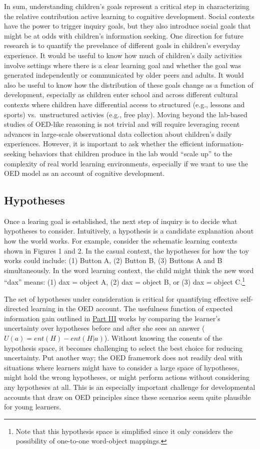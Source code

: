 \documentclass[oneside]{report}
\begin{document}
In sum, understanding children's goals represent a critical step in
characterizing the relative contribution active learning to cognitive
development. Social contexts have the power to trigger inquiry goals,
but they also introduce social goals that might be at odds with
children's information seeking. One direction for future research is to
quantify the prevelance of different goals in children's everyday
experience. It would be useful to know how much of children's daily
activities involve settings where there is a clear learning goal and
whether the goal was generated independently or communicated by older
peers and adults. It would also be useful to know how the distribution
of these goals change as a function of development, especially as
children enter school and across different cultural contexts where
children have differential access to structured (e.g., lessons and
sports) vs.~unstructured activies (e.g., free play). Moving beyond the
lab-based studies of OED-like reasoning is not trivial and will require
leveraging recent advances in large-scale observational data collection
about children's daily experiences. However, it is important to ask
whether the efficient information-seeking behaviors that children
produce in the lab would ``scale up'' to the complexity of real world
learning environments, especially if we want to use the OED model as an
account of cognitive development.

\hypertarget{hypotheses}{%
\subsection{Hypotheses}\label{hypotheses}}

Once a learing goal is established, the next step of inquiry is to
decide what hypotheses to consider. Intuitively, a hypothesis is a
candidate explanation about how the world works. For example, consider
the schematic learning contexts shown in Figures 1 and 2. In the casual
context, the hypotheses for how the toy works could include: (1) Button
A, (2) Button B, (3) Buttons A and B simultaneously. In the word
learning context, the child might think the new word ``dax'' means: (1)
dax = object A, (2) dax = object B, or (3) dax = object C.\footnote{Note
  that this hypothesis space is simplified since it only considers the
  possibility of one-to-one word-object mappings.}

The set of hypotheses under consideration is critical for quantifying
effective self-directed learning in the OED account. The usefulness
function of expected information gain outlined in
\protect\hyperlink{p3}{Part III} works by comparing the learner's
uncertainty over hypotheses before and after she sees an answer
(\(U(a) = ent(H) - ent(H|a)\)). Without knowing the conents of the
hypothesis space, it becomes challenging to select the best choice for
reducing uncertainty. Put another way; the OED framework does not
readily deal with situations where learners might have to consider a
large space of hypotheses, might hold the wrong hypotheses, or might
perform actions without considering any hypotheses at all. This is an
especially important challenge for developmental accounts that draw on
OED principles since these scenarios seem quite plausible for young
learners.
\end{document}
